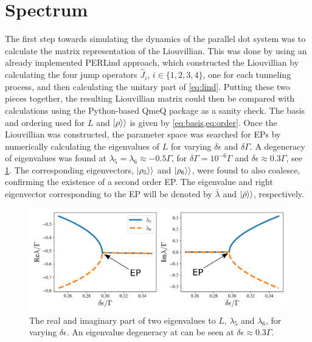 \documentclass[../main.tex]{subfiles}
\begin{document}
\section{Spectrum}
The first step towards simulating the dynamics of the parallel dot system was to calculate the matrix representation of the Liouvillian. This was done by using an already implemented PERLind approach, which constructed the Liouvillian by calculating the four jump operators $\hat J_i$, $i\in\{1,2,3,4\}$, one for each tunneling process, and then calculating the unitary part of \cref{eq:lind}. Putting these two pieces together, the resulting Liouvillian matrix could then be compared with calculations using the Python-based QmeQ package \cite{qmeq} as a sanity check. The basis and ordering used for $L$ and $\ket{\rho}\rangle$ is given by \cref{eq:basis,eq:order}. Once the Liouvillian was constructed, the parameter space was searched for EPs by numerically calculating the eigenvalues of $L$ for varying $\delta\epsilon$ and $\delta\Gamma$. A degeneracy of eigenvalues was found at $\lambda_5 = \lambda_6\approx -0.5\Gamma$, for $\delta\Gamma = 10^{-6}\Gamma$ and $\delta\epsilon \approx 0.3\Gamma$, see \cref{fig:tuning}. The corresponding eigenvectors, $\ket{\rho_5}\rangle$ and $\ket{\rho_6}\rangle$, were found to also coalesce, confirming the existence of a second order EP. The eigenvalue and right eigenvector corresponding to the EP will be denoted by $\bar \lambda$ and $\ket{\bar\rho}\rangle$, respectively.
\begin{figure}[H]
    \centering
    \includegraphics[width=0.9\linewidth]{figures/tuning.png}
    \caption{The real and imaginary part of two eigenvalues to $L$, $\lambda_5$ and $\lambda_6$, for varying $\delta\epsilon$. An eigenvalue degeneracy at can be seen at $\delta\epsilon\approx0.3\Gamma$.}
    \label{fig:tuning}
\end{figure}
\end{document}
